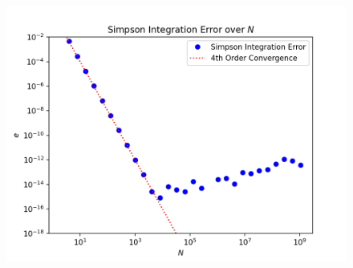 \documentclass[10pt, reqno]{amsart}
\begin{document}
\begin{multicols}{2}
\begin{figure}[H]
    \centering
    \includegraphics[width=1\linewidth]{Simpson Integration Error over N.png}
    \label{fig:1}
\end{figure}

\end{multicols}
\end{document}
